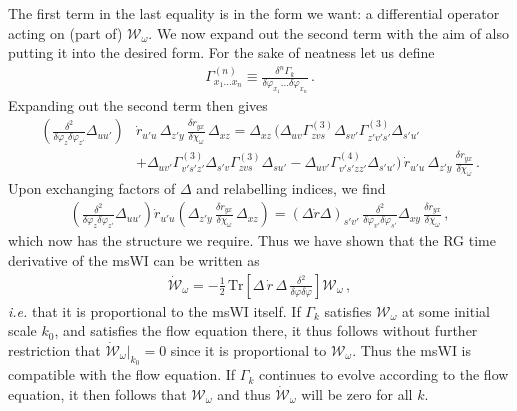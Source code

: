 \documentclass[11pt]{book} %
\numberwithin{equation}{chapter}
\begin{document}
The first term in the last equality is in the form we want: a differential operator acting on (part of)
$\mathcal{W_\omega}$. We now expand out the second term with the aim of also putting it into the desired form.
For the sake of neatness let us define
\begin{align}
  \Gamma_{x_1...x_n}^{(n)} \equiv \frac{\delta^n\Gamma_k}{\delta\varphi_{x_1}...\delta\varphi_{x_n}} \,.
\end{align}
Expanding out the second term then gives
\begin{align}
\label{step1}
	\left(\frac{\delta^2}{\delta\varphi_z\delta\varphi_{z'}}\Delta_{uu'}\right)
	&\dot r_{u'u} \, \Delta_{z'y} \, \frac{\delta r_{yx}}{\delta\chi_\omega} \, \Delta_{xz}
  = \Delta_{xz} \, \bigg(\Delta_{uv}\Gamma^{(3)}_{zvs}\Delta_{sv'}\Gamma^{(3)}_{z'v's'}\Delta_{s'u'} \nonumber\\
    &+\Delta_{uv'}\Gamma^{(3)}_{v's'z'}\Delta_{s'v}\Gamma^{(3)}_{zvs}\Delta_{su'}
  -\Delta_{uv'}\Gamma^{(4)}_{v's'zz'}\Delta_{s'u'}\bigg) \,
	\dot r_{u'u} \, \Delta_{z'y} \, \frac{\delta r_{yx}}{\delta\chi_\omega} \,.
\end{align}
Upon exchanging factors of $\Delta$ and relabelling indices, we find
\begin{align}
\label{step2}
	\left(\frac{\delta^2}{\delta\varphi_{z}\delta\varphi_{z'}}\Delta_{uu'}\right)
	\dot r_{u'u}\left(\Delta_{z'y} \, \frac{\delta r_{yx}}{\delta\chi_{\omega}} \, \Delta_{xz}\right)=
	(\Delta\dot r\Delta)_{s'v'} \, \frac{\delta^2}{\delta\varphi_{v'}\delta\varphi_{s'}}
	\Delta_{xy} \, \frac{\delta r_{yx}}{\delta\chi_{\omega}} \,,
\end{align}
which now has the structure we require.
Thus we have shown that the RG time derivative of the msWI can be written as
\begin{align}
	\mathcal{\dot W}_{\omega}=-\frac{1}{2} \, \mathrm{Tr}
	\left[\Delta \, \dot r \, \Delta \, \frac{\delta^2}{\delta\varphi\delta\varphi}\right]
  \mathcal{W}_{\omega} \,,
\end{align}
\emph{i.e.} that it is proportional to the msWI itself.
If $\Gamma_{k}$ satisfies $\mathcal{W_\omega}$ at some initial scale $k_0$,
and satisfies the flow equation there, it thus follows without further restriction that
$\mathcal{\dot W_\omega}|_{k_{0}}=0$ since it is proportional to $\mathcal{W_\omega}$.
Thus the msWI is compatible with the flow equation.
If $\Gamma_{k}$ continues to evolve according to the flow equation,
it then follows that $\mathcal{W_\omega}$ and thus $\mathcal{\dot W_\omega}$ will be zero for all $k$.
\end{document}
